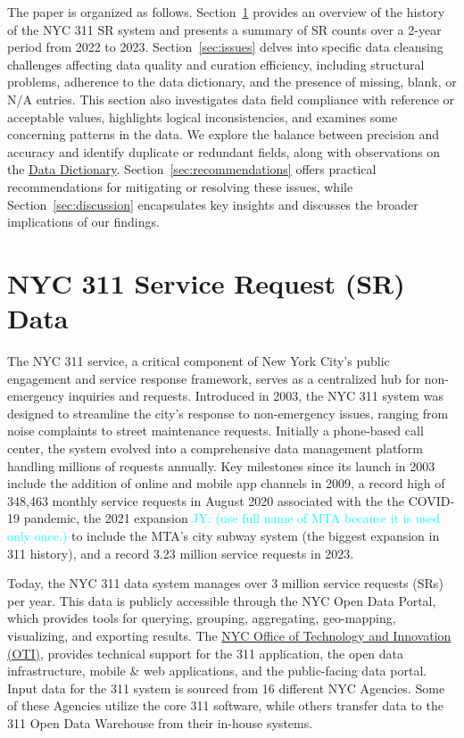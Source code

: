\documentclass[linenumber]{jdsart}
\newcommand{\jy}[1]{\textcolor{cyan}{JY: (#1)}}
\begin{document}
The paper is organized as follows. Section~\ref{sec:data} provides 
an overview of the history of the NYC 311 SR system and presents 
a summary of SR counts over a 2\mbox{-}year period from 2022 to 2023. 
Section~\ref{sec:issues} delves into specific data cleansing 
challenges affecting data quality and curation efficiency, 
including structural problems, adherence to the data dictionary, 
and the presence of missing, blank, or N/A entries. This section
 also investigates data field compliance with reference or acceptable values, 
highlights logical inconsistencies, and examines some concerning patterns 
in the data. We explore the balance between precision and accuracy 
and identify duplicate or redundant fields, along with observations 
on the \href{https://data.cityofnewyork.us/api/views/erm2-nwe9/files/b372b884-f86a-453b-ba16-1fe06ce9d212?download=true&filename=311_ServiceRequest_2010-Present_DataDictionary_Updated_2023.xlsx}{Data Dictionary}.
Section~\ref{sec:recommendations} offers 
practical recommendations for mitigating or resolving these issues, 
while Section~\ref{sec:discussion} encapsulates key insights and 
discusses the broader implications of our findings.


\section{NYC 311 Service Request (SR) Data} 
\label{sec:data}

The NYC 311 service, a critical component of New York City's public
engagement and service response framework, serves as a centralized hub
for non\mbox{-}emergency inquiries and requests. Introduced in 2003, the NYC
311 system was designed to streamline the city's response to
non\mbox{-}emergency issues, ranging from noise complaints to street
maintenance requests. Initially a phone\mbox{-}based call center, the system
evolved into a comprehensive data management platform handling
millions of requests annually. Key milestones since its launch in 2003
include the addition of online and mobile app channels in 2009, a
record high of 348,463 monthly service requests in August 2020 associated 
with the the COVID\mbox{-}19 pandemic, the 2021 expansion 
\jy{use full name of MTA because it is used only once.}
to include the MTA's city subway system (the biggest 
expansion in 311  history), and a record 3.23 million 
service requests in 2023.


Today, the NYC 311 data system manages over 3 million service
requests (SRs) per year. This data is publicly accessible through the NYC Open Data
Portal, which provides tools for querying, grouping, aggregating,
geo\mbox{-}mapping, visualizing, and exporting results. The
\href{https://www.nyc.gov/content/oti/pages/}{NYC Office of Technology 
and Innovation (OTI)}, provides technical support for 
the 311 application, the open data infrastructure, mobile \& web applications, 
and the public\mbox{-}facing data portal. Input data for the 311 system 
is sourced from 16 different NYC Agencies. Some of these Agencies
utilize the core 311 software, while others transfer data to the
311 Open Data Warehouse from their in\mbox{-}house systems.
\end{document}
